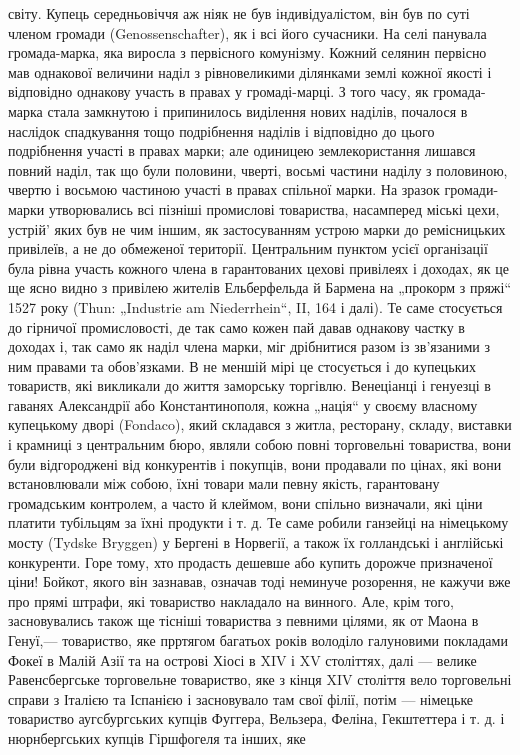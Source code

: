 \parcont{}  %
світу. Купець середньовіччя аж ніяк не був індивідуалістом, він був по суті членом громади (Genossenschafter), як і всі його
сучасники. На селі панувала громада-марка, яка виросла з первісного комунізму. Кожний селянин первісно мав однакової
величини наділ з рівновеликими ділянками землі кожної якості і відповідно однакову участь в правах у громаді-марці. З того
часу, як громада-марка стала замкнутою і припинилось виділення нових наділів, почалося в наслідок спадкування тощо
подрібнення наділів і відповідно до цього подрібнення участі в правах марки; але одиницею землекористання лишався повний
наділ, так що були половини, чверті, восьмі частини наділу з половиною, чвертю і восьмою частиною участі в правах спільної
марки. На зразок громади-марки утворювались всі пізніші промислові товариства, насамперед міські цехи, устрій'
яких був не чим іншим, як застосуванням устрою марки до ремісницьких привілеїв, а не до обмеженої території. Центральним
пунктом усієї організації була рівна участь кожного члена в гарантованих цехові привілеях і доходах, як це ще ясно видно з
привілею жителів Ельберфельда й Бармена на „прокорм з пряжі“ 1527 року (Thun: „Industrie am Niederrhein“,  II, 164 і далі).
Те саме стосується до гірничої промисловості, де так само кожен пай давав однакову частку в доходах і, так само як наділ
члена марки, міг дрібнитися разом із зв’язаними з ним правами та обов’язками. В не меншій мірі це стосується і до купецьких
товариств, які викликали до життя заморську торгівлю. Венеціанці і генуезці в гаванях Александрії або Константинополя, кожна
„нація“ у своєму власному купецькому дворі (Fondaco), який складався з житла, ресторану, складу, виставки і крамниці з
центральним бюро, являли собою повні торговельні товариства, вони були відгороджені від конкурентів і покупців, вони
продавали по цінах, які вони встановлювали між собою, їхні товари мали певну якість, гарантовану громадським контролем, а
часто й клеймом, вони спільно визначали, які ціни платити тубільцям за їхні продукти і т. д. Те саме робили ганзейці на
німецькому мосту (Tydske Bryggen) у Бергені в Норвегії, а також їх голландські і англійські конкуренти. Горе тому, хто
продасть дешевше або купить дорожче призначеної ціни! Бойкот, якого він зазнавав, означав тоді неминуче розорення, не кажучи
вже про прямі штрафи, які товариство накладало на винного. Але, крім того, засновувались також ще тісніші товариства з
певними цілями, як от Маона в Генуї,—  товариство, яке прртягом багатьох років володіло галуновими покладами Фокеї в Малій
Азії та на острові Хіосі в XIV і XV  століттях, далі — велике Равенсбергське торговельне товариство, яке з кінця XIV
століття вело торговельні справи з Італією та Іспанією і засновувало там свої філії, потім — німецьке товариство
аугсбургських купців Фуггера, Вельзера, Феліна, Гекштеттера і т. д. і нюрнбергських купців Гіршфогеля та інших, яке
\parbreak{}  %
